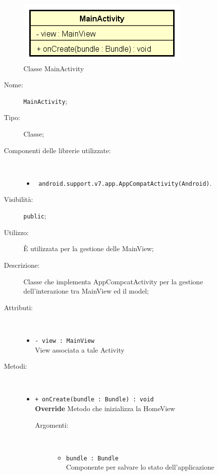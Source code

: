 \documentclass[../DefinizioneDiProdotto.tex]{subfiles}
\begin{document}
    \begin{figure}[H]
        \centering
        \includegraphics{img/MainActivity.png}
        \caption{Classe MainActivity}\label{fig:presenter::MainActivity} 
    \end{figure}
    \begin{description}
\item[Nome:] \texttt{MainActivity};
\item[Tipo:] Classe;
\item[Componenti delle librerie utilizzate:] \
\begin{itemize}
\item \texttt{ android.support.v7.app.AppCompatActivity(Android)}.

\end{itemize}
\item[Visibilità:] \texttt{public};
\item[Utilizzo:] È utilizzata per la gestione delle MainView;
\item[Descrizione:] Classe che implementa AppCompcatActivity per la gestione dell'interazione tra MainView ed il model;
\item[Attributi:] \
\begin{itemize}
\item \texttt{- view : MainView}\\
View associata a tale Activity

\end{itemize}
\item[Metodi:] \
\begin{itemize}
\item \texttt{+ onCreate(bundle : Bundle) : void}\\
\textbf{Override} Metodo che inizializza la HomeView
 \begin{description}
\item[Argomenti:] \
\begin{itemize}
\item \texttt{bundle : Bundle}\\
Componente per salvare lo stato dell'applicazione\end{itemize}
\end{description}
\end{itemize}
\end{description}
\end{document}
